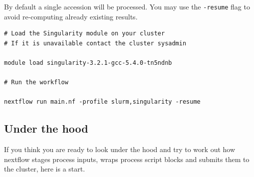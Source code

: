 \begin{steps}
By default a single accession will be processed. 
You may use the \texttt{-resume} flag to avoid re-computing already existing results. 


\begin{lstlisting}
# Load the Singularity module on your cluster
# If it is unavailable contact the cluster sysadmin

module load singularity-3.2.1-gcc-5.4.0-tn5ndnb

# Run the workflow

nextflow run main.nf -profile slurm,singularity -resume
\end{lstlisting}
\end{steps}



\subsection{Under the hood}

If you think you are ready to look under the hood and try to work out how nextflow stages process inputs, wraps process script blocks and submits them to the cluster, here is a start. 

